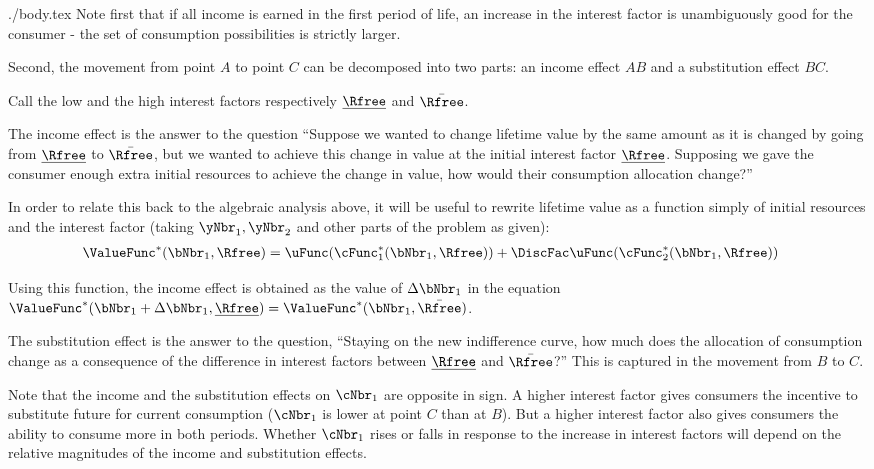 \documentclass{handout}
\begin{document}
\begin{verbatimwrite}{./body.tex}
  Note first that if all income is earned in the first period of life, an
  increase in the interest factor is unambiguously good for the consumer -
  the set of consumption possibilities is strictly larger.

  Second, the movement from point $A$ to point $C$ can be decomposed into two parts: an
  income effect $AB$ and a substitution effect $BC$.

  Call the low and the high interest factors respectively
  $\underline{\Rfree}$ and $\bar{\Rfree}$.

  The income effect is the answer to the question ``Suppose we wanted to change lifetime value by the same amount as it is changed by going from $\underline{\Rfree}$ to $\bar{\Rfree}$, but we wanted to achieve this change in value at the initial interest factor $\underline{\Rfree}$.  Supposing we gave the consumer enough extra initial resources to achieve the change in value, how would their consumption allocation change?''

  In order to relate this back to the algebraic analysis above, it will be useful to rewrite lifetime value as a function simply of initial resources and the interest factor (taking ${\yNbr_{1},\yNbr_{2}}$ and other parts of the problem as given):
  \begin{equation}\begin{gathered}\begin{aligned}
        \ValueFunc^{*}(\bNbr_{1},\Rfree) & =  \uFunc(\cFunc_{1}^{*}(\bNbr_{1},\Rfree))+\DiscFac \uFunc(\cFunc_{2}^{*}(\bNbr_{1},\Rfree))
      \end{aligned}\end{gathered}\end{equation}

  Using this function, the income effect is obtained as the value of
  $\Delta \bNbr_{1}$ in the equation $\ValueFunc^{*}(\bNbr_{1}+\Delta
  \bNbr_{1},\underline{\Rfree})=\ValueFunc^{*}(\bNbr_{1},\bar{\Rfree})$.

  The substitution effect is the answer to the question, ``Staying
  on the new indifference curve, how much does the allocation of
  consumption change as a consequence of the difference in
  interest factors between $\underline{\Rfree}$ and $\bar{\Rfree}$?''  This
  is captured in the movement from $B$ to $C$.

  Note that the income and the substitution effects on $\cNbr_{1}$ are
  opposite in sign.  A higher interest factor gives consumers the
  incentive to substitute future for current consumption ($\cNbr_{1}$ is
  lower at point $C$ than at $B$).  But a higher interest factor also
  gives consumers the ability to consume more in both periods.  Whether
  $\cNbr_{1}$ rises or falls in response to the increase in interest factors
  will depend on the relative magnitudes of the income and substitution
  effects.


\end{verbatimwrite}
\end{document}
